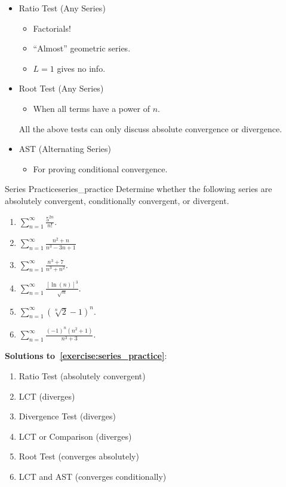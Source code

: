 \begin{itemize}
    \item Ratio Test (Any Series)
          \begin{itemize}
              \item Factorials!
              \item ``Almost'' geometric series.
              \item $ L=1 $ gives no info.
          \end{itemize}
    \item Root Test (Any Series)
          \begin{itemize}
              \item When all terms have a power of $ n $.
          \end{itemize}
          All the above tests can only discuss absolute convergence or divergence.
    \item AST (Alternating Series)
          \begin{itemize}
              \item For proving conditional convergence.
          \end{itemize}
\end{itemize}

\begin{Exercise}{Series Practice}{series_practice}
    Determine whether the following series are absolutely convergent,
    conditionally convergent, or divergent.
    \begin{enumerate}[label=(\roman*)]
        \item $ \displaystyle \sum\limits_{n=1}^{\infty}\frac{5^{2n}}{n!} $.
        \item $ \displaystyle \sum\limits_{n=1}^{\infty} \frac{n^2+n}{n^3-3n+1} $
        \item $ \displaystyle \sum\limits_{n=1}^{\infty} \frac{n^3+7}{n^3+n^2} $.
        \item $ \displaystyle \sum\limits_{n=1}^{\infty} \frac{\left[ \ln(n) \right]^3}{\sqrt{n}} $.
        \item $ \displaystyle \sum\limits_{n=1}^{\infty} (\sqrt[n]{2}-1)^n $.
        \item $ \displaystyle \sum\limits_{n=1}^{\infty} \frac{(-1)^n(n^2+1)}{n^3+3} $.
    \end{enumerate}
\end{Exercise}
\textbf{Solutions to~\ref{exercise:series_practice}}:
\begin{enumerate}[label=(\roman*)]
    \item Ratio Test (absolutely convergent)
    \item LCT (diverges)
    \item Divergence Test (diverges)
    \item LCT or Comparison (diverges)
    \item Root Test (converges absolutely)
    \item LCT and AST (converges conditionally)
\end{enumerate}
